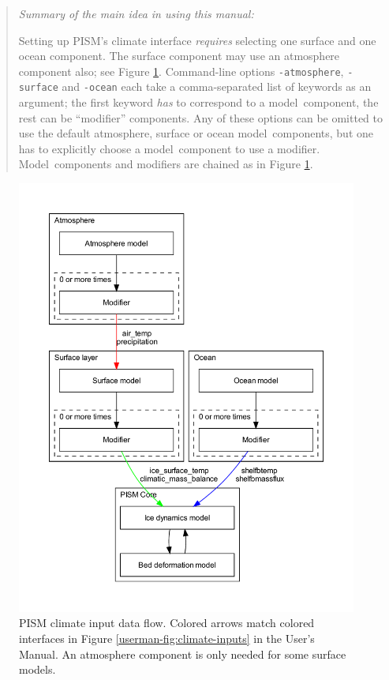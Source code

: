 \documentclass[titlepage,letterpaper,final]{scrartcl}
\begin{document}
\vspace{0.3in}

\begin{quote}
\begin{center}
\emph{Summary of the main idea in using this manual:}
\end{center}

Setting up PISM's climate interface \emph{requires} selecting one surface and one
ocean component. The surface component may use an atmosphere component also;
see Figure \ref{fig:climate-input-data-flow}. Command-line options
\texttt{-atmosphere}, \texttt{-surface} and \texttt{-ocean} each take a
comma-separated list of keywords as an argument; the first keyword \emph{has}
to correspond to a model~component, the rest can be ``modifier'' components.
Any of these options can be omitted to use the default atmosphere, surface or
ocean model~components, but one has to explicitly choose a model~component
to use a modifier. Model~components and modifiers are chained as in Figure
\ref{fig:climate-input-data-flow}.
\end{quote}

\begin{figure}
  \centering
  \includegraphics[width=5in]{data-flow.pdf}
  \caption{PISM climate input data flow.  Colored arrows match colored interfaces in
    Figure \ref*{userman-fig:climate-inputs} in the User's Manual.  An atmosphere component is only needed for some surface models.}
  \label{fig:climate-input-data-flow}
\end{figure}
\end{document}

